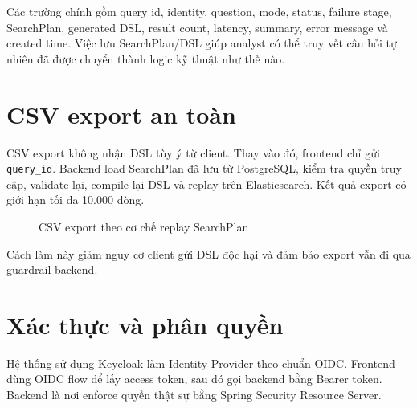\documentclass[12pt,a4paper]{report}
\begin{document}
Các trường chính gồm query id, identity, question, mode, status, failure stage, SearchPlan, generated DSL, result count, latency, summary, error message và created time. Việc lưu SearchPlan/DSL giúp analyst có thể truy vết câu hỏi tự nhiên đã được chuyển thành logic kỹ thuật như thế nào.

\section{CSV export an toàn}

CSV export không nhận DSL tùy ý từ client. Thay vào đó, frontend chỉ gửi \texttt{query\_id}. Backend load SearchPlan đã lưu từ PostgreSQL, kiểm tra quyền truy cập, validate lại, compile lại DSL và replay trên Elasticsearch. Kết quả export có giới hạn tối đa 10.000 dòng.

\begin{figure}[H]
\centering
{}
\caption{CSV export theo cơ chế replay SearchPlan}
\label{fig:csv}
\end{figure}

Cách làm này giảm nguy cơ client gửi DSL độc hại và đảm bảo export vẫn đi qua guardrail backend.

\section{Xác thực và phân quyền}

Hệ thống sử dụng Keycloak làm Identity Provider theo chuẩn OIDC. Frontend dùng OIDC flow để lấy access token, sau đó gọi backend bằng Bearer token. Backend là nơi enforce quyền thật sự bằng Spring Security Resource Server.
\end{document}
